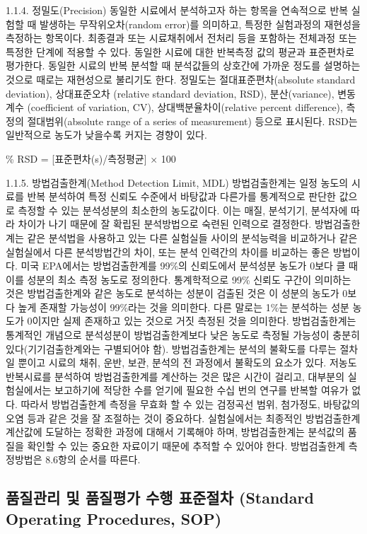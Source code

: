 \documentclass[
]{book}
\begin{document}
1.1.4. 정밀도(Precision)
동일한 시료에서 분석하고자 하는 항목을 연속적으로 반복 실험할 때 발생하는 무작위오차(random error)를 의미하고, 특정한 실험과정의 재현성을 측정하는 항목이다. 최종결과 또는 시료채취에서 전처리 등을 포함하는 전체과정 또는 특정한 단계에 적용할 수 있다. 동일한 시료에 대한 반복측정 값의 평균과 표준편차로 평가한다. 동일한 시료의 반복 분석할 때 분석값들의 상호간에 가까운 정도를 설명하는 것으로 때로는 재현성으로 불리기도 한다. 정밀도는 절대표준편차(absolute standard deviation), 상대표준오차 (relative standard deviation, RSD), 분산(variance), 변동계수 (coefficient of variation, CV), 상대백분율차이(relative percent difference), 측정의 절대범위(absolute range of a series of measurement) 등으로 표시된다. RSD는 일반적으로 농도가 낮을수록 커지는 경향이 있다.

\% RSD = {[}표준편차(s)/측정평균{]} × 100

1.1.5. 방법검출한계(Method Detection Limit, MDL)
방법검출한계는 일정 농도의 시료를 반복 분석하여 특정 신뢰도 수준에서 바탕값과 다른가를 통계적으로 판단한 값으로 측정할 수 있는 분석성분의 최소한의 농도값이다. 이는 매질, 분석기기, 분석자에 따라 차이가 나기 때문에 잘 확립된 분석방법으로 숙련된 인력으로 결정한다. 방법검출한계는 같은 분석법을 사용하고 있는 다른 실험실들 사이의 분석능력을 비교하거나 같은 실험실에서 다른 분석방법간의 차이, 또는 분석 인력간의 차이를 비교하는 좋은 방법이다. 미국 EPA에서는 방법검출한계를 99\%의 신뢰도에서 분석성분 농도가 0보다 클 때 이를 성분의 최소 측정 농도로 정의한다. 통계학적으로 99\% 신뢰도 구간이 의미하는 것은 방법검출한계와 같은 농도로 분석하는 성분이 검출된 것은 이 성분의 농도가 0보다 높게 존재할 가능성이 99\%라는 것을 의미한다. 다른 말로는 1\%는 분석하는 성분 농도가 0이지만 실제 존재하고 있는 것으로 거짓 측정된 것을 의미한다. 방법검출한계는 통계적인 개념으로 분석성분이 방법검출한계보다 낮은 농도로 측정될 가능성이 충분히 있다(기기검출한계와는 구별되어야 함). 방법검출한계는 분석의 불확도를 다루는 절차일 뿐이고 시료의 채취, 운반, 보관, 분석의 전 과정에서 불확도의 요소가 있다.
저농도 반복시료를 분석하여 방법검출한계를 계산하는 것은 많은 시간이 걸리고, 대부분의 실험실에서는 보고하기에 적당한 수를 얻기에 필요한 수십 번의 연구를 반복할 여유가 없다. 따라서 방법검출한계 측정을 무효화 할 수 있는 검정곡선 범위, 첨가정도, 바탕값의 오염 등과 같은 것을 잘 조절하는 것이 중요하다. 실험실에서는 최종적인 방법검출한계 계산값에 도달하는 정확한 과정에 대해서 기록해야 하며, 방법검출한계는 분석값의 품질을 확인할 수 있는 중요한 자료이기 때문에 추적할 수 있어야 한다. 방법검출한계 측정방법은 8.6항의 순서를 따른다.

\hypertarget{uxd488uxc9c8uxad00uxb9ac-uxbc0f-uxd488uxc9c8uxd3c9uxac00-uxc218uxd589-uxd45cuxc900uxc808uxcc28-standard-operating-procedures-sop-1}{%
\subsection{품질관리 및 품질평가 수행 표준절차 (Standard Operating Procedures, SOP)}\label{uxd488uxc9c8uxad00uxb9ac-uxbc0f-uxd488uxc9c8uxd3c9uxac00-uxc218uxd589-uxd45cuxc900uxc808uxcc28-standard-operating-procedures-sop-1}}
\end{document}
